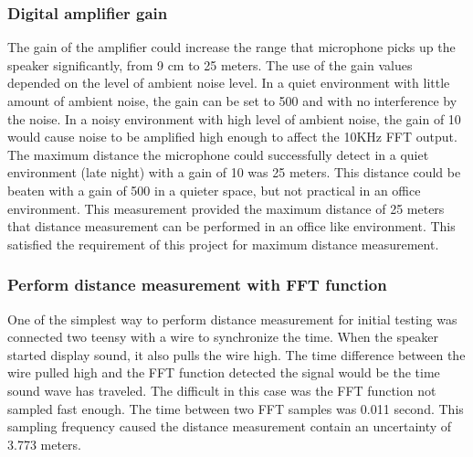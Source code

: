 \subsubsection{Digital amplifier gain}
The gain of the amplifier could increase the range that microphone picks up the speaker significantly, from 9 cm to 25 meters. The use of the gain values depended on the level of ambient noise level. In a quiet environment with little amount of ambient noise, the gain can be set to 500 and with no interference by the noise. In a noisy environment with high level of ambient noise, the gain of 10 would cause noise to be amplified high enough to affect the 10KHz FFT output. The maximum distance the microphone could successfully detect in a quiet environment (late night) with a gain of 10 was 25 meters. This distance could be beaten with a gain of 500 in a quieter space, but not practical in an office environment. This measurement provided the maximum distance of 25 meters that distance measurement can be performed in an office like environment. This satisfied the requirement of this project for maximum distance measurement.


\subsubsection{Perform distance measurement with FFT function}
One of the simplest way to perform distance measurement for initial testing was connected two teensy with a wire to synchronize the time. When the speaker started display sound, it also pulls the wire high. The time difference between the wire pulled high and the FFT function detected the signal would be the time sound wave has traveled. The difficult in this case was the FFT function not sampled fast enough. The time between two FFT samples was 0.011 second. This sampling frequency caused the distance measurement contain an uncertainty of 3.773 meters. 





